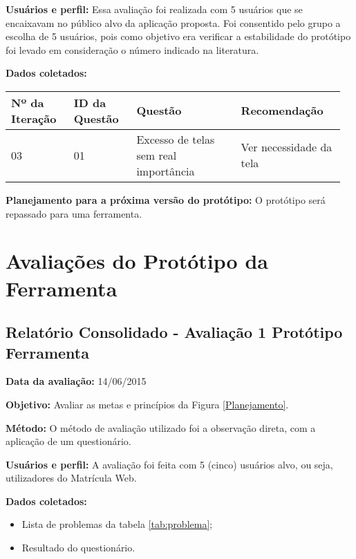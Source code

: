 \textbf{Usuários e perfil:}
Essa avaliação foi realizada com 5 usuários que se encaixavam no público alvo da aplicação proposta. 
Foi consentido pelo grupo a escolha de 5 usuários, pois como objetivo era verificar a estabilidade
do protótipo foi levado em consideração o número indicado na literatura.

\textbf{Dados coletados:}

\begin{table*}[!h]
\caption{Lista de problemas. Fonte: \cite{preece} adaptado}
\label{tab:problema}
  \begin{tabular}{p{0.18\linewidth}p{0.18\linewidth}p{0.30\linewidth}p{0.30\linewidth}}
  \hline
    Nº da Iteração & ID da Questão & Questão & Recomendação\\
 \hline
    03 & 01 & Excesso de telas sem real importância & Ver necessidade da tela\\
  \end{tabular}
\end{table*}

\textbf{Planejamento para a próxima versão do protótipo:}
O protótipo será repassado para uma ferramenta.

\vfill
\pagebreak

\section{Avaliações do Protótipo da Ferramenta}

  \subsection{Relatório Consolidado - Avaliação 1 Protótipo Ferramenta}

  \flushleft \textbf{Data da avaliação:} 
  14/06/2015

  \textbf{Objetivo:}
  Avaliar as metas e princípios da Figura \ref{Planejamento}.

  \textbf{Método:}
  O método de avaliação utilizado foi a observação direta, com a aplicação de um questionário.

  \textbf{Usuários e perfil:}
  A avaliação foi feita com 5 (cinco) usuários alvo, ou seja, utilizadores do Matrícula Web.
  
  \textbf{Dados coletados:}

  \begin{itemize}
  \item Lista de problemas da tabela \ref{tab:problema};
  \item Resultado do questionário.
  \end{itemize}



